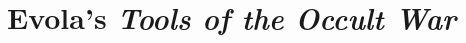 \documentclass[a4paper,12pt,twoside]{book}
\begin{document}
\let\tmp\oddsidemargin
\let\oddsidemargin\evensidemargin
\let\evensidemargin\tmp
\reversemarginpar


\providecommand{\flright}[1]{\begin{flushright}#1\end{flushright}}
\providecommand{\flrightit}[1]{\begin{flushright}\itshape #1\end{flushright}}
{}

\pagestyle{fancy}
\renewcommand{\sectionmark}[1]{\markright{#1}}
\renewcommand{\chaptermark}[1]{\markboth{#1}{}}

%

\frontmatter
%

%

\tableofcontents

\mainmatter

\fancyhf{}
\fancyhead[LE]{\small \thepage$\quad${\scshape\chaptername{} \thechapter}: \nouppercase{\itshape\leftmark}}



\chapter{Evola's \textit{Tools of the Occult War}}


\end{document}
